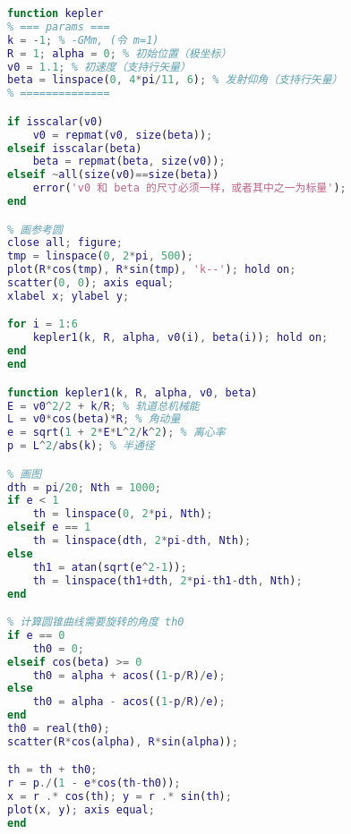 \begin{lstlisting}[language=matlab]
% 已知初始位置、发射速度、发射方向， 求轨道以及运动方程
function kepler
% === params ===
k = -1; % -GMm, (令 m=1)
R = 1; alpha = 0; % 初始位置（极坐标）
v0 = 1.1; % 初速度（支持行矢量）
beta = linspace(0, 4*pi/11, 6); % 发射仰角（支持行矢量）
% ==============

if isscalar(v0)
    v0 = repmat(v0, size(beta));
elseif isscalar(beta)
    beta = repmat(beta, size(v0));
elseif ~all(size(v0)==size(beta))
    error('v0 和 beta 的尺寸必须一样，或者其中之一为标量');
end

% 画参考圆
close all; figure;
tmp = linspace(0, 2*pi, 500);
plot(R*cos(tmp), R*sin(tmp), 'k--'); hold on;
scatter(0, 0); axis equal;
xlabel x; ylabel y;

for i = 1:6
    kepler1(k, R, alpha, v0(i), beta(i)); hold on;
end
end

function kepler1(k, R, alpha, v0, beta)
E = v0^2/2 + k/R; % 轨道总机械能
L = v0*cos(beta)*R; % 角动量
e = sqrt(1 + 2*E*L^2/k^2); % 离心率
p = L^2/abs(k); % 半通径

% 画图
dth = pi/20; Nth = 1000;
if e < 1
    th = linspace(0, 2*pi, Nth);
elseif e == 1
    th = linspace(dth, 2*pi-dth, Nth);
else
    th1 = atan(sqrt(e^2-1));
    th = linspace(th1+dth, 2*pi-th1-dth, Nth);
end

% 计算圆锥曲线需要旋转的角度 th0
if e == 0
    th0 = 0;
elseif cos(beta) >= 0
    th0 = alpha + acos((1-p/R)/e);
else
    th0 = alpha - acos((1-p/R)/e);
end
th0 = real(th0);
scatter(R*cos(alpha), R*sin(alpha));

th = th + th0;
r = p./(1 - e*cos(th-th0));
x = r .* cos(th); y = r .* sin(th);
plot(x, y); axis equal;
end
\end{lstlisting}
